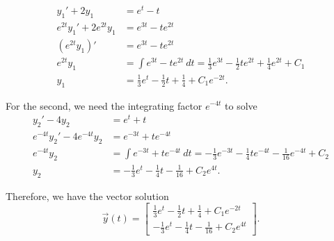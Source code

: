 \begin{exampleSol}
\begin{equation*}
\begin{split}
y_1' + 2y_1 &= e^t - t \\
e^{2t}y_1' + 2e^{2t}y_1 &= e^{3t} - te^{2t} \\
(e^{2t}y_1)' &= e^{3t} - te^{2t} \\
e^{2t}y_1 &= \int e^{3t} - te^{2t}\ dt = \frac{1}{3}e^{3t} - \frac{1}{2}te^{2t} + \frac{1}{4}e^{2t} + C_1 \\
y_1 &= \frac{1}{3}e^t - \frac{1}{2} t + \frac{1}{4} + C_1e^{-2t}.
\end{split}
\end{equation*}

For the second, we need the integrating factor $e^{-4t}$ to solve
\begin{equation*}
\begin{split}
y_2' - 4y_2 &= e^t + t \\
e^{-4t}y_2' - 4e^{-4t}y_2 &= e^{-3t} + te^{-4t} \\
e^{-4t}y_2 &= \int e^{-3t} + te^{-4t}\ dt = -\frac{1}{3}e^{-3t} - \frac{1}{4}te^{-4t} - \frac{1}{16}e^{-4t} + C_2 \\
y_2 &= -\frac{1}{3}e^{t} - \frac{1}{4}t - \frac{1}{16} + C_2e^{4t}. 
\end{split}
\end{equation*}

Therefore, we have the vector solution
\begin{equation*}
\vec{y}(t) = \begin{bmatrix} 
\frac{1}{3}e^t - \frac{1}{2} t + \frac{1}{4} + C_1e^{-2t} \\
-\frac{1}{3}e^{t} - \frac{1}{4}t - \frac{1}{16} + C_2e^{4t}
\end{bmatrix}. 
\end{equation*}


\end{exampleSol}

